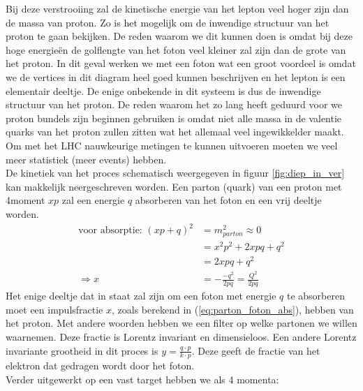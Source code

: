 \documentclass[../main.tex]{subfiles}
\begin{document}
Bij deze verstrooiing zal de kinetische energie van het lepton veel hoger zijn dan de massa van proton. Zo is het mogelijk om de inwendige structuur van het proton te gaan bekijken. De reden waarom we dit kunnen doen is omdat bij deze hoge energieën de golflengte van het foton veel kleiner zal zijn dan de grote van het proton. In dit geval werken we met een foton wat een groot voordeel is omdat we de vertices in dit diagram heel goed kunnen beschrijven en het lepton is een elementair deeltje. De enige onbekende in dit systeem is dus de inwendige structuur van het proton. De reden waarom het zo lang heeft geduurd voor we proton bundels zijn beginnen gebruiken is omdat niet alle massa in de valentie quarks van het proton zullen zitten wat het allemaal veel ingewikkelder maakt. Om met het LHC nauwkeurige metingen te kunnen uitvoeren moeten we veel meer statistiek (meer events) hebben.\\
De kinetiek van het proces schematisch weergegeven in figuur \ref{fig:diep_in_ver} kan makkelijk neergeschreven worden. Een parton (quark) van een proton met 4moment $xp$ zal een energie $q$ absorberen van het foton en een vrij deeltje worden.
\begin{equation}
    \begin{aligned}
        \label{eq:parton_foton_abs}
        \text{voor absorptie: }(xp+q)^2 &= m_{parton}^2 \approx 0\\
                                        &=x^2p^2+2xpq+q^2\\
                                        &=2xpq+q^2\\
                          \Rightarrow x &=- \frac{-q^2}{2pq} = \frac{Q^2}{2pq} 
    \end{aligned}
\end{equation}
Het enige deeltje dat in staat zal zijn om een foton met energie $q$ te absorberen moet een impulsfractie $x$, zoals berekend in (\ref{eq:parton_foton_abs}), hebben van het proton. Met andere woorden hebben we een filter op welke partonen we willen waarnemen. Deze fractie is Lorentz invariant en dimensieloos. Een andere Lorentz invariante grootheid in dit proces is $y=\frac{q\cdot p}{k\cdot p}$. Deze geeft de fractie van het elektron dat gedragen wordt door het foton.\\
Verder uitgewerkt op een vast target hebben we als 4 momenta:
\end{document}
